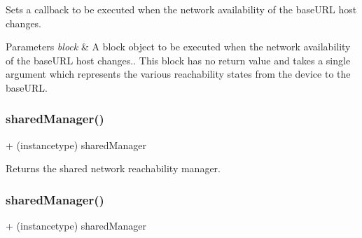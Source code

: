 Sets a callback to be executed when the network availability of the {\ttfamily base\+U\+RL} host changes.


\begin{DoxyParams}{Parameters}
{\em block} & A block object to be executed when the network availability of the {\ttfamily base\+U\+RL} host changes.. This block has no return value and takes a single argument which represents the various reachability states from the device to the {\ttfamily base\+U\+RL}. \\
\hline
\end{DoxyParams}
\mbox{\label{interface_a_f_network_reachability_manager_abc98fb713ecc5de942904768512ea1d0}} 
\subsubsection{\texorpdfstring{shared\+Manager()}{sharedManager()}\hspace{0.1cm}{\footnotesize\ttfamily [1/3]}}
{\footnotesize\ttfamily + (instancetype) shared\+Manager \begin{DoxyParamCaption}{ }\end{DoxyParamCaption}}

Returns the shared network reachability manager. \mbox{\label{interface_a_f_network_reachability_manager_abc98fb713ecc5de942904768512ea1d0}} 
\subsubsection{\texorpdfstring{shared\+Manager()}{sharedManager()}\hspace{0.1cm}{\footnotesize\ttfamily [2/3]}}
{\footnotesize\ttfamily + (instancetype) shared\+Manager \begin{DoxyParamCaption}{ }\end{DoxyParamCaption}}

